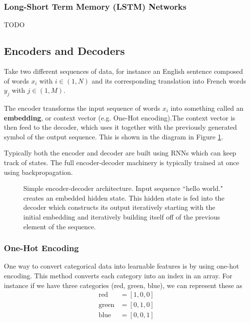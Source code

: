 \subsubsection{Long-Short Term Memory (LSTM) Networks}
TODO

\subsection{Encoders and Decoders}
Take two different sequences of data, for instance an English sentence composed of words $x_i$ with $i\in (1,N)$ and its corresponding translation into French words $y_j$ with $j\in(1,M)$.

The encoder transforms the input sequence of words $x_i$ into something called an \textbf{embedding}, or context vector (e.g. One-Hot encoding).The context vector is then feed to the decoder, which uses it together with the previously generated symbol of the output sequence. This is shown in the diagram in Figure \ref{fig:encoder-decoder}.

Typically both the encoder and decoder are built using RNNs which can keep track of states. The full encoder-decoder machinery is typically trained at once using backpropagation.

\begin{figure}
\centerline{}
\caption{Simple encoder-decoder architecture. Input sequence ``hello world." creates an embedded hidden state. This hidden state is fed into the decoder which constructs its output iteratively starting with the initial embedding and iteratively building itself off of the previous element of the sequence. \cite{zhang}}
\label{fig:encoder-decoder}
\end{figure}


\subsubsection{One-Hot Encoding}
One way to convert categorical data into learnable features is by using one-hot encoding. This method converts each category into an index in an array. For instance if we have three categories (red, green, blue), we can represent these as
\begin{align}
    \textrm{red} &= [1,0,0]\\
    \textrm{green} &= [0,1,0]\\
    \textrm{blue} &= [0,0,1]
\end{align}

